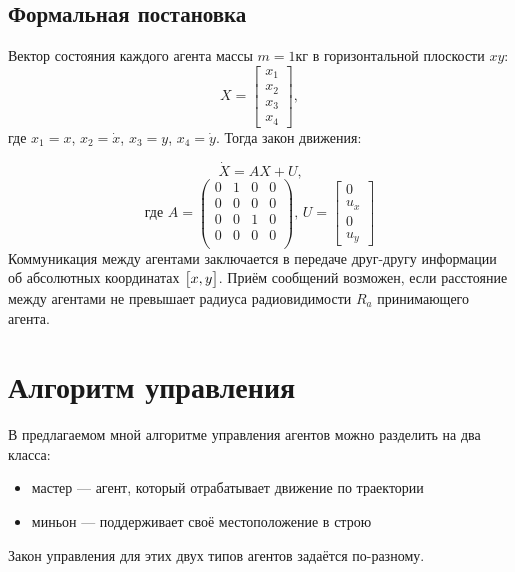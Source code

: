 \documentclass[a4paper, 14pt]{extarticle}
\let\Oldsection\section
\renewcommand{\section}{\FloatBarrier\Oldsection}
\let\Oldsubsection\subsection
\renewcommand{\subsection}{\FloatBarrier\Oldsubsection}
\begin{document}
\subsection{Формальная постановка}
Вектор состояния каждого агента массы $m = 1\text{кг}$ в горизонтальной плоскости $xy$:
$$ X = 
\begin{bmatrix}
	x_1 \\
	x_2 \\
	x_3 \\
	x_4
\end{bmatrix} ,
$$
где $x_1 = x$, $x_2 = \dot{x}$, $x_3 = y$, $x_4 = \dot{y}$. Тогда закон движения: \par
$$\dot{X} = AX + U\text{,}$$
$$\text{где } A =  \left(\begin{array}{cccc} 0 & 1 & 0 & 0 \\ 0 & 0 & 0 & 0 \\ 0 & 0 & 1 & 0 \\ 0 & 0 & 0 & 0 \\ \end{array}\right) \text{, } 
 U = 
 \begin{bmatrix}
 0 \\
 u_x \\
 0 \\
 u_y
 \end{bmatrix} 
$$
Коммуникация между агентами заключается в передаче друг-другу информации об абсолютных координатах $\big{[}x, y\big{]}$. Приём сообщений возможен, если расстояние между агентами не превышает радиуса радиовидимости $R_a$ принимающего агента. \par 
\section{Алгоритм управления}
В предлагаемом мной алгоритме управления агентов можно разделить на два класса:
\begin{itemize}
	\item мастер — агент, который отрабатывает движение по траектории
	\item миньон — поддерживает своё местоположение в строю
\end{itemize}
Закон управления для этих двух типов агентов задаётся по-разному.
\end{document}
